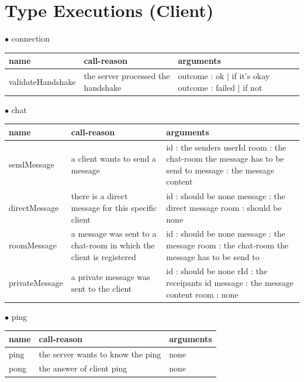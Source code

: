 \documentclass{scrartcl}
\newcommand{\n}{\newline}
\begin{document}
\section{Type Executions (Client)}
$\bullet$ connection
\begin{center}
    \begin{tabular}{| p{3.1cm} | p{5cm} | p{5.9cm} |}
        \hline
        \textbf{name} & \textbf{call-reason} & \textbf{arguments} \\ \hline
        validateHandshake & the server processed the handshake & outcome : ok $|$ if it's okay \n
        outcome : failed $|$ if not \\ \hline 
    \end{tabular}
\end{center}
$\bullet$ chat
\begin{center}
    \begin{tabular}{| p{3.1cm} | p{5cm} | p{5.9cm} |}
        \hline
        \textbf{name} & \textbf{call-reason} & \textbf{arguments} \\ \hline
        sendMessage & a client wants to send a message & 
        id : the senders userId\n
        room : the chat-room the message has to be send to\n
        message : the message content \\ \hline

        directMessage & there is a direct message for this specific client & id : should be none \n
        message : the direct message \n
        room : should be none \\ \hline

        roomMessage & a message was sent to a chat-room in which the client is registered & id : should be none \n
        message : the message \n
        room : the chat-room the message has to be send to \\ \hline

        privateMessage & a private message was sent to the client & id : should be none \n
        rId : the receipants id \n
        message : the message content \n
        room : none \\ \hline
    \end{tabular}
\end{center}
$\bullet$ ping
\begin{center}
    \begin{tabular}{| p{3.1cm} | p{5cm} | p{5.9cm} |}
        \hline
        \textbf{name} & \textbf{call-reason} & \textbf{arguments} \\ \hline
        ping & the server wants to know the ping & none \\ \hline
        pong & the answer of client ping & none \\ \hline
    \end{tabular}
\end{center}
\end{document}
